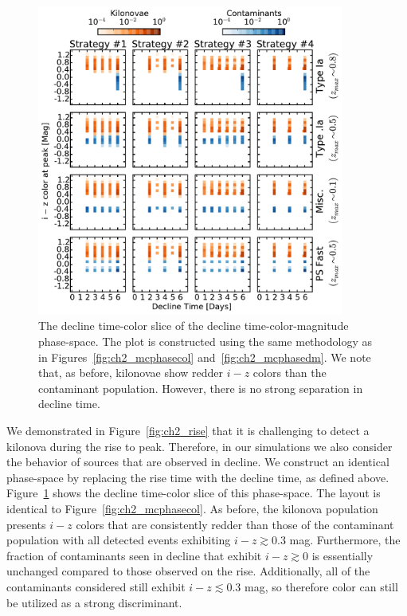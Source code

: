 \begin{figure}[t!]
\centering
\includegraphics[width=0.9\textwidth]{./figs/chapter2/ch2_f10.pdf}
\caption{The decline time-color slice of the decline time-color-magnitude phase-space. The plot is constructed using the same methodology as in Figures~\ref{fig:ch2_mcphasecol} and~\ref{fig:ch2_mcphasedm}. We note that, as before, kilonovae show redder $i-z$ colors than the contaminant population. However, there is no strong separation in decline time.}
\label{fig:ch2_deccol}
\end{figure}

We demonstrated in Figure~\ref{fig:ch2_rise} that it is challenging to detect a kilonova during the rise to peak. Therefore, in our simulations we also consider the behavior of sources that are observed in decline. We construct an identical phase-space by replacing the rise time with the decline time, as defined above. Figure~\ref{fig:ch2_deccol} shows the decline time-color slice of this phase-space. The layout is identical to Figure~\ref{fig:ch2_mcphasecol}. As before, the kilonova population presents $i-z$ colors that are consistently redder than those of the contaminant population with all detected events exhibiting $i-z \gtrsim 0.3$ mag. Furthermore, the fraction of contaminants seen in decline that exhibit $i-z\gtrsim0$ is essentially unchanged compared to those observed on the rise. Additionally, all of the contaminants considered still exhibit $i-z \lesssim 0.3$ mag, so therefore color can still be utilized as a strong discriminant.

